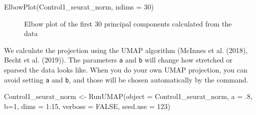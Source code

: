 \documentclass[
  letterpaper,
  DIV=11,
  numbers=noendperiod]{scrartcl}
\newenvironment{Shaded}{\begin{snugshade}}{\end{snugshade}}
\newcommand{\AttributeTok}[1]{\textcolor[rgb]{0.40,0.45,0.13}{#1}}
\newcommand{\ConstantTok}[1]{\textcolor[rgb]{0.56,0.35,0.01}{#1}}
\newcommand{\DecValTok}[1]{\textcolor[rgb]{0.68,0.00,0.00}{#1}}
\newcommand{\FunctionTok}[1]{\textcolor[rgb]{0.28,0.35,0.67}{#1}}
\newcommand{\NormalTok}[1]{\textcolor[rgb]{0.00,0.23,0.31}{#1}}
\newcommand{\OtherTok}[1]{\textcolor[rgb]{0.00,0.23,0.31}{#1}}
\newcommand{\SpecialCharTok}[1]{\textcolor[rgb]{0.37,0.37,0.37}{#1}}
\begin{document}
\begin{Shaded}
\begin{Highlighting}[]
\FunctionTok{ElbowPlot}\NormalTok{(Control1\_seurat\_norm, }\AttributeTok{ndims =} \DecValTok{30}\NormalTok{)}
\end{Highlighting}
\end{Shaded}

\begin{figure}[H]


\caption{\label{fig-elbow}Elbow plot of the first 30 principal
components calculated from the data}

\end{figure}%

We calculate the projection using the UMAP algorithm (McInnes et al.
(2018), Becht et al. (2019)). The parameters \texttt{a} and \texttt{b}
will change how stretched or sparsed the data looks like. When you do
your own UMAP projection, you can avoid setting \texttt{a} and
\texttt{b}, and those will be chosen automatically by the command.

\begin{Shaded}
\begin{Highlighting}[]
\NormalTok{Control1\_seurat\_norm }\OtherTok{\textless{}{-}} \FunctionTok{RunUMAP}\NormalTok{(}\AttributeTok{object =}\NormalTok{ Control1\_seurat\_norm, }
                                         \AttributeTok{a =}\NormalTok{ .}\DecValTok{8}\NormalTok{, }\AttributeTok{b=}\DecValTok{1}\NormalTok{,}
                                         \AttributeTok{dims =} \DecValTok{1}\SpecialCharTok{:}\DecValTok{15}\NormalTok{, }
                                         \AttributeTok{verbose =} \ConstantTok{FALSE}\NormalTok{, }
                                         \AttributeTok{seed.use =} \DecValTok{123}\NormalTok{)}
\end{Highlighting}
\end{Shaded}
\end{document}
